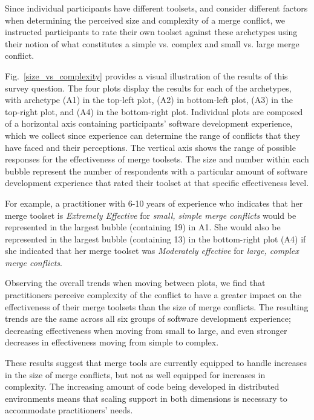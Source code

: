 Since individual participants have different toolsets, and consider different factors when determining the perceived size and complexity of a merge conflict, we instructed participants to rate their own toolset against these archetypes using their notion of what constitutes a simple vs. complex and small vs. large merge conflict.

Fig.~\ref{size_vs_complexity} provides a visual illustration of the results of this survey question.
The four plots display the results for each of the archetypes, with archetype (A1) in the top-left plot, (A2) in bottom-left plot, (A3) in the top-right plot, and (A4) in the bottom-right plot.
Individual plots are composed of a horizontal axis containing participants' software development experience, which we collect since experience can determine the range of conflicts that they have faced and their perceptions.
The vertical axis shows the range of possible responses for the effectiveness of merge toolsets.
The size and number within each bubble represent the number of respondents with a particular amount of software development experience that rated their toolset at that specific effectiveness level.

For example, a practitioner with 6-10 years of experience who indicates that her merge toolset is \textit{Extremely Effective} for \textit{small, simple merge conflicts} would be represented in the largest bubble (containing 19) in A1. %
She would also be represented in the largest bubble (containing 13) in the bottom-right plot (A4) if she indicated that her merge toolset was \textit{Moderately effective} for \textit{large, complex merge conflicts}.

Observing the overall trends when moving between plots, we find that practitioners perceive complexity of the conflict to have a greater impact on the effectiveness of their merge toolsets than the size of merge conflicts.
The resulting trends are the same across all six groups of software development experience; decreasing effectiveness when moving from small to large, and even stronger decreases in effectiveness moving from simple to complex.

These results suggest that merge tools are currently equipped to handle increases in the size of merge conflicts, but not as well equipped for increases in complexity.
The increasing amount of code being developed in distributed environments means that scaling support in both dimensions is necessary to accommodate practitioners' needs.